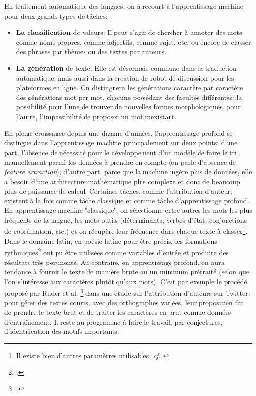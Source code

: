 En traitement automatique des langues, on a recourt à l'apprentissage machine pour deux grands types de tâches:
\begin{itemize}
    \item \textbf{La classification} de valeurs. Il peut s'agir de chercher à annoter des mots comme noms propres, comme adjectifs, comme sujet, etc. ou encore de classer des phrases par thèmes ou des textes par auteurs.
    \item \textbf{La génération} de texte. Elle est désormais commune dans la traduction automatique, mais aussi dans la création de robot de discussion pour les plateformes en ligne. On distinguera les générations caractère par caractère des générations mot par mot, chacune possédant des facultés différentes: la possibilité pour l'une de trouver de nouvelles formes morphologiques, pour l'autre, l'impossibilité de proposer un mot inexistant.
\end{itemize}{}

En pleine croissance depuis une dizaine d'années, l'apprentissage profond se distingue dans l'apprentissage machine principalement sur deux points: d'une part, l'absence de nécessité pour le développement d'un modèle de faire le tri manuellement parmi les données à prendre en compte (on parle d'absence de \textit{feature extraction}); d'autre part, parce que la machine ingère plus de données, elle a besoin d'une architecture mathématique plus complexe et donc de beaucoup plus de puissance de calcul. Certaines tâches, comme l'attribution d'auteur, existent à la fois comme tâche classique et comme tâche d'apprentissage profond. En apprentissage machine "classique", on sélectionne entre autres les mots les plus fréquents de la langue, les mots outils (déterminants, verbes d'état, conjonctions de coordination, etc.) et on récupère leur fréquence dans chaque texte à classer\footnote{Il existe bien d'autres paramètres utilisables, \textit{cf.} \cite{Cafieroeaax5489}}. Dans le domaine latin, en poésie latine pour être précis, les formations rythmiques\footcite{nagy_metre_nodate} ont pu être utilisées comme variables d'entrée et produire des résultats très pertinents. Au contraire, en apprentissage profond, on aura tendance à fournir le texte de manière brute ou un minimum prétraité (selon que l'on s'intéresse aux caractères plutôt qu'aux mots). C'est par exemple le procédé proposé par Ruder et al. \footcite{ruder_character-level_2016} dans une étude sur l'attribution d'auteurs sur Twitter: pour gérer des textes courts, avec des orthographes variées, leur proposition fut de prendre le texte brut et de traiter les caractères en brut comme données d'entraînement. Il reste au programme à faire le travail, par conjectures, d'identification des motifs importants.

